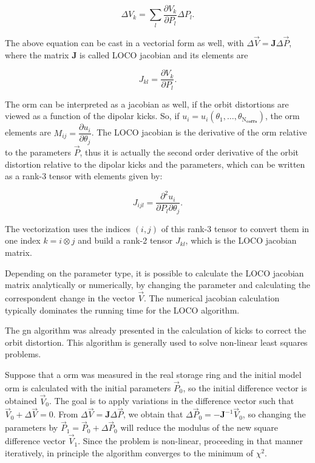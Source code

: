 \begin{equation}
\Delta V_{k} = \sum_{l}\dfrac{\partial V_{k}}{\partial P_{l}} \Delta P_{l}.
\label{eq:loco_params}
\end{equation}

The above equation can be cast in a vectorial form as well, with $\Delta \vec{V} = \mathbf{J}\Delta \vec{P}$, where the matrix $\mathbf{J}$ is called LOCO jacobian and its elements are 

\begin{equation}
    J_{kl} = \dfrac{\partial V_{k}}{\partial P_{l}}.
\end{equation}

The \gls{orm} can be interpreted as a jacobian as well, if the orbit distortions are viewed as a function of the dipolar kicks. So, if $u_i = u_i\left(\theta_1, \ldots, \theta_{\mathrm{N}_{\mathbf{corrs}}}\right)$, the \gls{orm} elements are $M_{ij} = \dfrac{\partial u_i}{\partial \theta_j}$. The LOCO jacobian is the derivative of the \gls{orm} relative to the parameters $\vec{P}$, thus it is actually the second order derivative of the orbit distortion relative to the dipolar kicks and the parameters, which can be written as a rank-3 tensor with elements given by:

\begin{equation}
    J_{ijl} = \dfrac{\partial^2 u_i}{\partial P_{l}\partial \theta_j}.
\end{equation}

The vectorization uses the indices $(i, j)$ of this rank-3 tensor to convert them in one index $k = i \otimes j$ and build a rank-2 tensor $J_{kl}$, which is the LOCO jacobian matrix.

Depending on the parameter type, it is possible to calculate the LOCO jacobian matrix analytically or numerically, by changing the parameter and calculating the correspondent change in the vector $\vec{V}$. The numerical jacobian calculation typically dominates the running time for the LOCO algorithm.

The \gls{gn} algorithm was already presented in the calculation of kicks to correct the orbit distortion. This algorithm is generally used to solve non-linear least squares problems. 

Suppose that a \gls{orm} was measured in the real storage ring and the initial model \gls{orm} is calculated with the initial parameters $\vec{P}_0$, so the initial difference vector is obtained $\vec{V}_0$. The goal is to apply variations in the difference vector such that $\vec{V}_0 + \Delta \vec{V} = 0$. From $\Delta \vec{V} = \mathbf{J}\Delta \vec{P}$, we obtain that $\Delta \vec{P}_0 = -\mathbf{J}^{-1} \vec{V}_0$, so changing the parameters by $\vec{P}_1 = \vec{P}_0 + \Delta \vec{P}_0$ will reduce the modulus of the new square difference vector $\vec{V}_1$. Since the problem is non-linear, proceeding in that manner iteratively, in principle the algorithm converges to the minimum of $\chi^2$.

